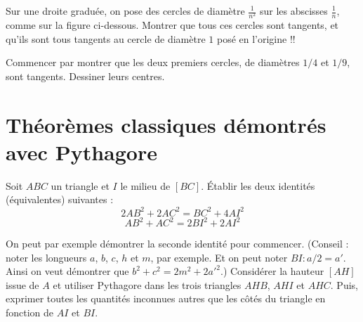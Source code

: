 
\begin{exo}
Sur une droite graduée, on \og pose\fg{} des cercles de diamètre $\frac{1}{n^2}$ sur les abscisses $\frac{1}{n}$, comme sur la figure ci-dessous. Montrer que tous ces cercles sont tangents, et qu'ils sont tous tangents au cercle de diamètre $1$ posé en l'origine !!
\begin{center}
\end{center}
\begin{hint}
Commencer par montrer que les deux premiers cercles, de diamètres $1/4$ et $1/9$, sont tangents. Dessiner leurs centres.
\end{hint}
\end{exo}


\section{Théorèmes classiques démontrés avec Pythagore}


\begin{exo}
Soit $ABC$ un triangle et $I$ le milieu de $[BC]$.
Établir les deux identités (équivalentes) suivantes :
\[ 2AB^2+2AC^2 = BC^2+4AI^2\]
\[ AB^2+AC^2 = 2BI^2+2AI^2\]
\begin{center}
\end{center}
\begin{hint}
On peut par exemple démontrer la seconde identité pour commencer.
(Conseil : noter les longueurs $a$, $b$, $c$, $h$ et $m$, par exemple. Et on peut noter $BI : a/2 = a'$. Ainsi on veut démontrer 
 que $b^2+c^2 = 2m^2+2a'^2$.)
Considérer la hauteur $[AH]$ issue de $A$ et utiliser Pythagore dans les trois triangles $AHB$, $AHI$ et $AHC$. Puis, exprimer toutes les quantités inconnues autres que les côtés du triangle en fonction de $AI$ et $BI$. 
\end{hint}
\end{exo}


